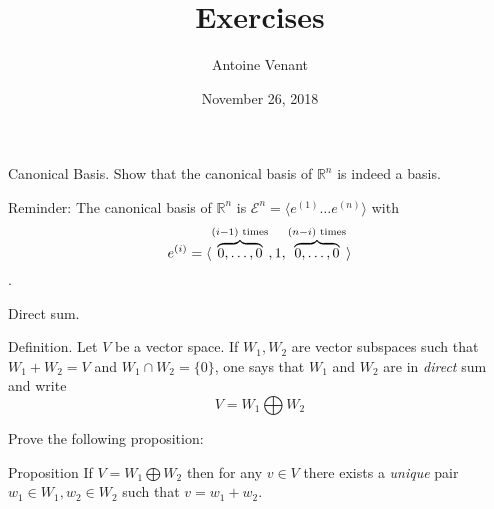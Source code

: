 \documentclass{beamer}
\begin{document}
\title{Exercises} 
\author{Antoine Venant}
\date{November 26, 2018}
\maketitle

\begin{frame}{Canonical Basis.}
  Show that the canonical basis of $\mathbb{R}^n$ is indeed a basis.
  
  \begin{exampleblock}{Reminder:}
    The canonical basis of $\mathbb{R}^n$ is $\mathcal{E}^n = \langle e^{(1)} \dots e^{(n)}\rangle$ with \[e^{(i)} = \langle \overbrace{0,\dots,0}^{(i-1) \textnormal{ times}}, 1, \overbrace{0,\dots,0}^{(n-i) \textnormal{ times}} \rangle\].
  \end{exampleblock}
 
\end{frame}

\begin{frame}{Direct sum.}
  \begin{block}{Definition.}
    Let $V$ be a vector space. If $W_1, W_2$ are vector subspaces such that $W_1 + W_2 = V$ and $W_1 \cap W_2 = \{0\}$, one says that $W_1$ and $W_2$ are in \emph{direct} sum and write \[V = W_1 \bigoplus W_2\]
  \end{block}

  Prove the following proposition:
  \begin{block}{Proposition}
    If $V = W_1 \bigoplus W_2$ then for any $v \in V$ there exists a \emph{unique} pair $w_1 \in W_1, w_2 \in W_2$ such that $v = w_1 + w_2$.
  \end{block}
\end{frame}
\end{document}
